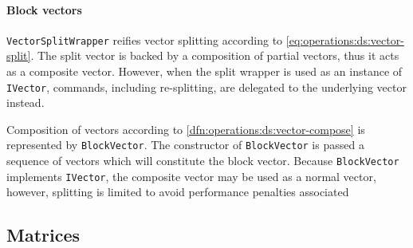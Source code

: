\paragraph{Block vectors}

\texttt{VectorSplitWrapper} reifies vector splitting according to
\vref{eq:operations:ds:vector-split}. The split vector is backed by a
composition of partial vectors, thus it acts as a composite
vector. However, when the split wrapper is used as an instance of
\texttt{IVector}, commands, including re-splitting, are delegated to
the underlying vector instead.

Composition of vectors according to
\vref{dfn:operations:ds:vector-compose} is represented by
\texttt{BlockVector}. The constructor of \texttt{BlockVector} is
passed a sequence of vectors which will constitute the block
vector. Because \texttt{BlockVector} implements \texttt{IVector}, the
composite vector may be used as a normal vector, however, splitting is
limited to avoid performance penalties associated 

\subsection{Matrices}

